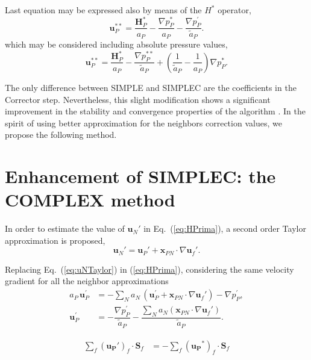\documentclass[final,3p,times,10pt,onecolumn]{myElsarticle}
\numberwithin{equation}{section}
\begin{document}
Last equation may be expressed also by means of the $H^*$ operator,
\begin{equation}
\boldsymbol{u}^{**}_P 
=
\dfrac
{\boldsymbol{H}_P^* }
{a_P}
- 
\frac{\nabla p_P^{*}}{a_P}
- 
\frac{\nabla p_P^{'}}{\tilde{a}_P}.
\end{equation}
which may be considered including absolute pressure values,
\begin{equation}
\boldsymbol{u}^{**}_P 
=
\dfrac
{\boldsymbol{H}_P^* }
{a_P}
- 
\frac{\nabla p_P^{**}}{\tilde{a}_P}
+
\left(
\dfrac{1}{\tilde{
a}_P}
-
\dfrac{1}{a_P}
\right)
\nabla p_P^{*}.
\end{equation}


The only difference between SIMPLE and SIMPLEC are the coefficients in the Corrector step. Nevertheless, this slight modification shows a significant improvement in the stability  and convergence properties of the algorithm \cite{liu}. In the spirit of using better approximation for the neighbors correction values, we propose the following method.

\section{Enhancement of SIMPLEC: the COMPLEX method}
\label{sec:COMPLEX}

In order to estimate the value of $\boldsymbol{u}_N'$ in Eq.~(\ref{eq:HPrima}), a second order Taylor approximation is proposed,
\begin{equation}\label{eq:uNTaylor}
\boldsymbol{u}_N' = \boldsymbol{u}_P' + \boldsymbol{x}_{PN}\cdot 
\nabla \boldsymbol{u}_f'.
\end{equation}

Replacing Eq.~(\ref{eq:uNTaylor}) in (\ref{eq:HPrima}), considering the same velocity gradient for all the neighbor approximations
\begin{align}
\label{eq:uPrimeCOMPLEX}
a_P\,\boldsymbol{u}_P^{'} 
&=
 -\sum_{N} a_{N}\, \left(\boldsymbol{u}_P^{'} + \boldsymbol{x}_{PN}\cdot \nabla \boldsymbol{u}_f'\right)- \nabla p_P^{'}, 
\\
\boldsymbol{u}_P^{'} 
&=
- \dfrac{\nabla p_P^{'}}
{\tilde{a}_P}
-
\dfrac
{
\sum_{N} a_{N} 
( 
\boldsymbol{x}_{PN} 
\cdot
\nabla \boldsymbol{u}_f' 
)
}
{\tilde{a}_P}.
\end{align}

\begin{align} 
\label{eq:div-free4Again}
\sum_f \left(\boldsymbol{u_P}'\right)_{f} \cdot \boldsymbol{S}_f &= -\sum_f \left(\boldsymbol{u_P}^{*}\right)_{f} \cdot \boldsymbol{S}_f 
\end{align}
\end{document}
